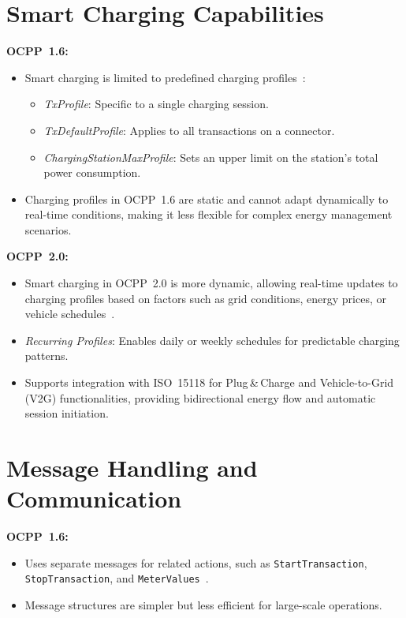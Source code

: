 \documentclass[12pt,a4paper]{report}
\begin{document}
\section{Smart Charging Capabilities}

\textbf{OCPP~1.6:}
\begin{itemize}
  \item Smart charging is limited to predefined charging profiles~\autocite{ocpp16_ed2}:
        \begin{itemize}
          \item \textit{TxProfile}: Specific to a single charging session.
          \item \textit{TxDefaultProfile}: Applies to all transactions on a connector.
          \item \textit{ChargingStationMaxProfile}: Sets an upper limit on the station's total
                power consumption.
        \end{itemize}
  \item Charging profiles in OCPP~1.6 are static and cannot adapt dynamically to real-time
        conditions, making it less flexible for complex energy management scenarios.
\end{itemize}

\textbf{OCPP~2.0:}
\begin{itemize}
  \item Smart charging in OCPP~2.0 is more dynamic, allowing real-time updates to charging
        profiles based on factors such as grid conditions, energy prices, or vehicle
        schedules~\autocite{ocpp201}.
  \item \textit{Recurring Profiles}: Enables daily or weekly schedules for predictable charging
        patterns.
  \item Supports integration with ISO~15118 for Plug\,\&\,Charge and Vehicle-to-Grid (V2G)
        functionalities, providing bidirectional energy flow and automatic session initiation.
\end{itemize}

\section{Message Handling and Communication}

\textbf{OCPP~1.6:}
\begin{itemize}
  \item Uses separate messages for related actions, such as \texttt{StartTransaction},
        \texttt{StopTransaction}, and \texttt{MeterValues}~\autocite{ocpp16_ed2}.
  \item Message structures are simpler but less efficient for large-scale operations.
\end{itemize}
\end{document}
